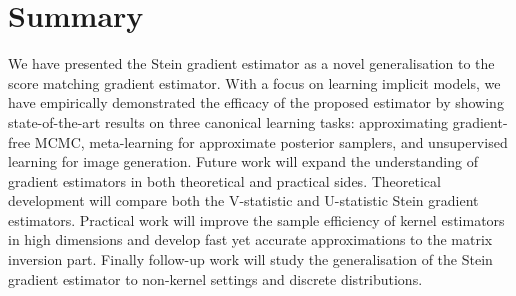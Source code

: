 \section{Summary}
\label{sec:conclusions}

We have presented the Stein gradient estimator as a novel generalisation to the score matching gradient estimator. With a focus on learning implicit models, we have empirically demonstrated the efficacy of the proposed estimator by showing state-of-the-art results on three canonical learning tasks: approximating gradient-free MCMC, meta-learning for approximate posterior samplers, and unsupervised learning for image generation. Future work will expand the understanding of gradient estimators in both theoretical and practical sides. Theoretical development will compare both the V-statistic and U-statistic Stein gradient estimators. Practical work will improve the sample efficiency of kernel estimators in high dimensions and develop fast yet accurate approximations to the matrix inversion part. Finally follow-up work will study the generalisation of the Stein gradient estimator to non-kernel settings and discrete distributions.